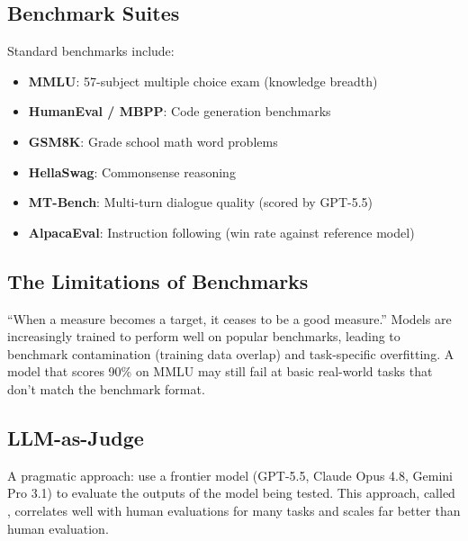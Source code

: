 \subsection{Benchmark Suites}

Standard benchmarks include:
\begin{itemize}[leftmargin=*]
    \item \textbf{MMLU}: 57-subject multiple choice exam (knowledge breadth)
    \item \textbf{HumanEval / MBPP}: Code generation benchmarks
    \item \textbf{GSM8K}: Grade school math word problems
    \item \textbf{HellaSwag}: Commonsense reasoning
    \item \textbf{MT-Bench}: Multi-turn dialogue quality (scored by GPT-5.5)
    \item \textbf{AlpacaEval}: Instruction following (win rate against reference model)
\end{itemize}

\subsection{The Limitations of Benchmarks}

\begin{cautionbox}
``When a measure becomes a target, it ceases to be a good measure.'' Models are increasingly trained to perform well on popular benchmarks, leading to benchmark contamination (training data overlap) and task-specific overfitting. A model that scores 90\% on MMLU may still fail at basic real-world tasks that don't match the benchmark format.
\end{cautionbox}

\subsection{LLM-as-Judge}

A pragmatic approach: use a frontier model (GPT-5.5, Claude Opus 4.8, Gemini Pro 3.1) to evaluate the outputs of the model being tested. This approach, called , correlates well with human evaluations for many tasks and scales far better than human evaluation.

